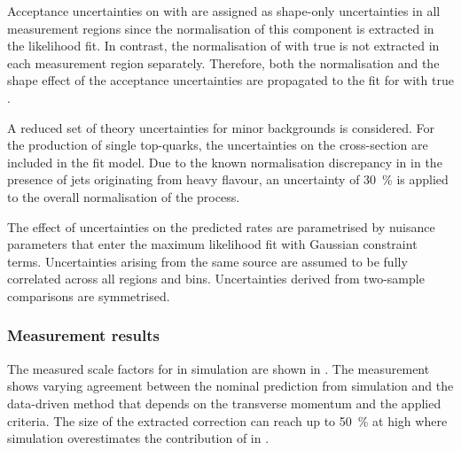 
Acceptance uncertainties on \ttbar with \faketauhadvis are assigned as
shape-only uncertainties in all measurement regions since the
normalisation of this component is extracted in the likelihood fit.
In contrast, the normalisation of \ttbar with true \tauhadvis is not
extracted in each measurement region separately. Therefore, both the
normalisation and the shape effect of the acceptance uncertainties are
propagated to the fit for \ttbar with true \tauhadvis.

A reduced set of theory uncertainties for minor backgrounds is
considered. For the production of single top-quarks, the uncertainties
on the cross-section are included in the fit model. Due to the known
normalisation discrepancy in \Vjets in the presence of jets
originating from heavy flavour, an uncertainty of \SI{30}{\percent} is
applied to the overall normalisation of the process.

The effect of uncertainties on the predicted rates are parametrised by
nuisance parameters that enter the maximum likelihood fit with
Gaussian constraint terms. Uncertainties arising from the same source
are assumed to be fully correlated across all regions and
bins. Uncertainties derived from two-sample comparisons are
symmetrised.


\subsubsection{Measurement results}

The measured scale factors for \faketauhadvis in \ttbar simulation are
shown in . The measurement shows varying
agreement between the nominal prediction from simulation and the
data-driven method that depends on the \tauhadvis transverse momentum
and the applied \tauid criteria. The size of the extracted correction
can reach up to \SI{50}{\percent} at high \tauhadvis \pT where
simulation overestimates the contribution of \faketauhadvis in \ttbar.

